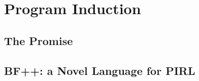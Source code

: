 \usepackage{lipsum}




\coverpage{\TITLE}{\SUBTITLE}{\AUTHOR}{\DATE}{\SUBJECT}

\newpage



\tableofcontents

\listoffigures

\listoftables


\printnomenclature

\part{Program Induction}
\newpage
\chapter{The Promise} \label{ch:autocode-motiv}

%

\newpage
\chapter{BF++: a Novel Language for PIRL}\label{ch:autocode-dsl}


